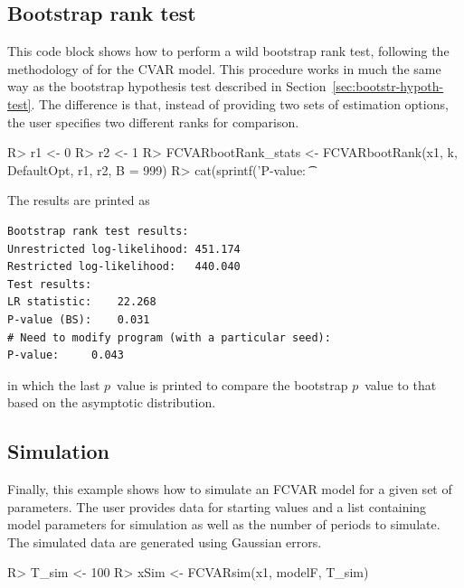 \documentclass[article]{jss}
\begin{document}
\subsection{Bootstrap rank test}
\label{sec:bootstrap-rank-test}

This code block
shows how to perform a wild bootstrap rank test, following the methodology of \cite{Cavaliere2010} for the CVAR model. This procedure works in much the same way as the bootstrap hypothesis test described in Section~\ref{sec:bootstr-hypoth-test}. The difference is that, instead of providing two sets of estimation options, the user specifies two different ranks for comparison.

\begin{Code}
R> r1 <- 0
R> r2 <- 1
R> FCVARbootRank_stats <- FCVARbootRank(x1, k, DefaultOpt, r1, r2, B = 999)
R> cat(sprintf('P-value: \t %
\end{Code}

The results are printed as
\begin{verbatim}
Bootstrap rank test results:
Unrestricted log-likelihood: 451.174
Restricted log-likelihood:   440.040
Test results:
LR statistic: 	 22.268
P-value (BS): 	 0.031
# Need to modify program (with a particular seed):
P-value: 	 0.043
\end{verbatim}
in which the last $p$~value is printed to compare the bootstrap $p$~value to that based on the asymptotic distribution. 

\subsection{Simulation}
\label{sec:simulation}

Finally, 
this example
shows how to simulate an FCVAR model for a given set of parameters. The user provides data for starting values and a list containing model parameters for simulation as well as the number of periods to simulate. The simulated data are generated using Gaussian errors.

\begin{Code}
R> T_sim <- 100
R> xSim <- FCVARsim(x1, modelF, T_sim)
\end{Code}
\end{document}
